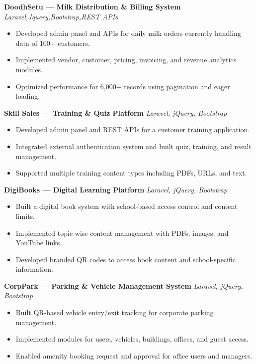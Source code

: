 \documentclass[10pt,a4paper]{article}
\begin{document}
\textbf{DoodhSetu — Milk Distribution \& Billing System} \hfill \textit{Laravel,Jquery,Bootstrap,REST APIs}
\vspace{2pt}
\begin{itemize}
  \item Developed admin panel and APIs  for daily milk orders currently handling data  of 100+ customers.
  \item Implemented vendor, customer, pricing, invoicing, and revenue analytics modules.
  \item Optimized performance for 6,000+ records using pagination and eager loading.
\end{itemize}

\textbf{Skill Sales — Training \& Quiz Platform} \hfill \textit{Laravel, jQuery, Bootstrap}
\vspace{2pt}
\begin{itemize}
  \item Developed admin panel and REST APIs for a customer training application.
  \item Integrated external authentication system and built quiz, training, and result management.
  \item Supported multiple training content types including PDFs, URLs, and text.
\end{itemize}

\textbf{DigiBooks — Digital Learning Platform} \hfill \textit{Laravel, jQuery, Bootstrap}
\vspace{2pt}
\begin{itemize}
  \item Built a digital book system with school-based access control and content limits.
  \item Implemented topic-wise content management with PDFs, images, and YouTube links.
  \item Developed branded QR codes to access book content and school-specific information.
\end{itemize}



\textbf{CorpPark — Parking \& Vehicle Management System} \hfill \textit{Laravel, jQuery, Bootstrap}
\vspace{2pt}
\begin{itemize}
  \item Built QR-based vehicle entry/exit tracking for corporate parking management.
  \item Implemented modules for users, vehicles, buildings, offices, and guest access.
  \item Enabled amenity booking request and approval for office users and managers.
\end{itemize}
\end{document}

